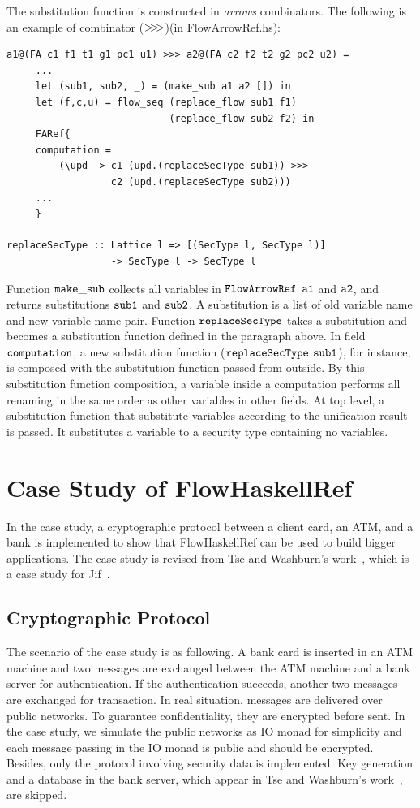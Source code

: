 \documentclass{report}
\newcommand{\arrowop}[1]{$#1\negthickspace #1\negthickspace #1$}
\newcommand{\co}[1]{$\cod{#1}$}
\begin{document}
The substitution function is constructed in {\em arrows} combinators. The following is an example of combinator
(\arrowop{>})(in FlowArrowRef.hs):
\begin{Verbatim}[fontsize=\small]
a1@(FA c1 f1 t1 g1 pc1 u1) >>> a2@(FA c2 f2 t2 g2 pc2 u2) =
     ...
     let (sub1, sub2, _) = (make_sub a1 a2 []) in
     let (f,c,u) = flow_seq (replace_flow sub1 f1) 
                            (replace_flow sub2 f2) in
     FARef{
     computation = 
         (\upd -> c1 (upd.(replaceSecType sub1)) >>>
                  c2 (upd.(replaceSecType sub2)))
     ...
     }

replaceSecType :: Lattice l => [(SecType l, SecType l)] 
                  -> SecType l -> SecType l
\end{Verbatim}
Function \co{make\_sub} collects all variables in \co{FlowArrowRef} \co{a1} and \co{a2}, and returns 
substitutions \co{sub1} and \co{sub2}. A substitution is a list of old variable name and new variable name pair. 
Function \co{replaceSecType} takes a substitution and becomes
a substitution function defined in the paragraph above. In field \co{computation}, a new substitution 
function (\co{replaceSecType} \co{sub1}), for instance,  
is composed with the substitution function
passed from outside. By this substitution function composition, a variable inside a computation 
performs all renaming in the same order as other variables in other fields. At top level, 
a substitution function that substitute variables according to the unification result is passed. 
It substitutes a variable to a security type containing no variables.

\chapter{Case Study of FlowHaskellRef}

In the case study, a cryptographic protocol between a client card, an ATM, and a bank is implemented
to show that FlowHaskellRef can be used to build bigger applications. The case study is revised
from Tse and Washburn's work~\cite{Tse:Washburn:jif}, which is a case study for Jif~\cite{jif}.

\section{Cryptographic Protocol}
The scenario of the case study is as following.
A bank card is inserted in an ATM machine and two messages are exchanged between the ATM 
machine and a bank server for authentication. If the authentication succeeds, another
two messages are exchanged for transaction. In real situation, messages are delivered over public
networks. To guarantee confidentiality, they are encrypted before sent. In the case study, we
simulate the public networks as IO monad for simplicity and each message passing in the IO monad is 
public and should be encrypted. Besides, only the protocol involving security data is implemented.
Key generation and a database in the bank server, which appear in 
Tse and Washburn's work~\cite{Tse:Washburn:jif}, are skipped.
\end{document}

